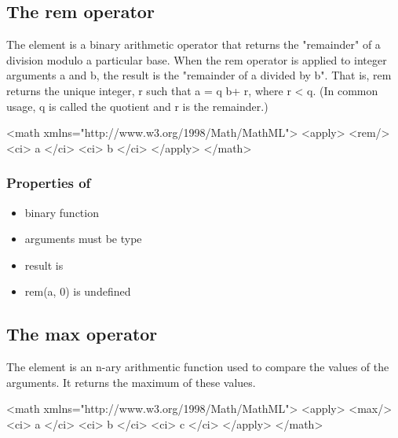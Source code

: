 \subsection{The rem operator}
\label{sec_rem}

The  element is a binary arithmetic operator that returns the "remainder" of a division modulo a particular base. When the rem operator is applied to integer arguments a and b, the result is the "remainder of a divided by b". That is, rem returns the unique integer, r such that a = q b+ r, where r < q. (In common usage, q is called the quotient and r is the remainder.)

\begin{example}
<math xmlns="http://www.w3.org/1998/Math/MathML">
    <apply>
        <rem/>
        <ci> a </ci>
        <ci> b </ci>
    </apply>
</math>
\end{example}

\subsubsection{Properties of }

\begin{itemize}\setlength{\parskip}{-0.3ex}

\item binary function

\item arguments must be type 

\item result is 

\item rem(a, 0) is undefined

\end{itemize}


\subsection{The max operator}
\label{sec_max}

The  element is an n-ary arithmentic function used to compare the values of the arguments. It returns the maximum of these values.

\begin{example}
<math xmlns="http://www.w3.org/1998/Math/MathML">
    <apply>
        <max/>
        <ci> a </ci>
        <ci> b </ci>
        <ci> c </ci>
    </apply>
</math>
\end{example}

